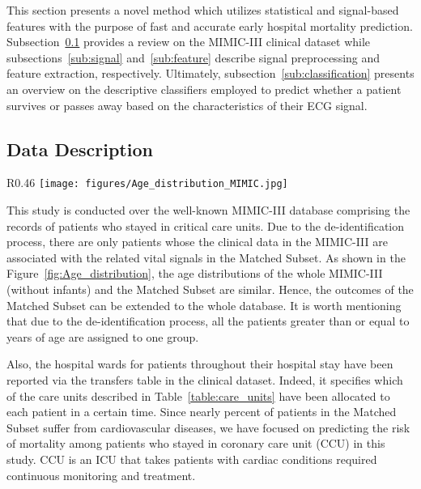\documentclass[3p]{elsarticle}
\begin{document}
This section presents a novel method which utilizes statistical and signal-based features with the purpose of fast and accurate early hospital mortality prediction. Subsection~\ref{sub:data_description} provides a review on the MIMIC-III clinical dataset while subsections~\ref{sub:signal} and~\ref{sub:feature} describe signal preprocessing and feature extraction, respectively. Ultimately, subsection~\ref{sub:classification} presents an overview on the descriptive classifiers employed to predict whether a patient survives or passes away based on the characteristics of their ECG signal.

\subsection{Data Description}
  \label{sub:data_description}

\begin{wrapfigure}{R}{0.46\textwidth}
\centering
\texttt{[image: figures/Age\_distribution\_MIMIC.jpg]}
\caption{The age distribution over the Whole MIMIC-III (without infants) and the Matched Subset}
\label{fig:Age_distribution}
\end{wrapfigure}

This study is conducted over the well-known MIMIC-III database comprising the records of  patients who stayed in critical care units. Due to the de-identification process, there are only  patients whose the clinical data in the MIMIC-III are associated with the related vital signals in the Matched Subset. As shown in the Figure~\ref{fig:Age_distribution}, the age distributions of the whole MIMIC-III (without infants) and the Matched Subset are similar. Hence, the outcomes of the Matched Subset can be extended to the whole database. It is worth mentioning that due to the de-identification process, all the patients greater than or equal to  years of age are assigned to one group.

Also, the hospital wards for patients throughout their hospital stay have been reported via the transfers table in the clinical dataset. Indeed, it specifies which of the care units described in Table~\ref{table:care_units} have been allocated to each patient in a certain time. Since nearly  percent of patients in the Matched Subset suffer from cardiovascular diseases, we have focused on predicting the risk of mortality among patients who stayed in coronary care unit (CCU) in this study. CCU is an ICU that takes patients with cardiac conditions required continuous monitoring and treatment.
\end{document}

